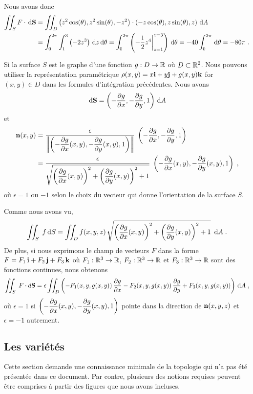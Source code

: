 {\begin{egg}
Nous avons donc
\begin{align*}
\iint_S F \cdot \,\mathrm{d}\mathbf{S} &=  
\iint_D \left( z^2 \cos(\theta) , z^2\sin(\theta), -z^2\right) \cdot
\left( -z\cos(\theta) , z \sin(\theta) , z\right) \,\mathrm{d}A \\
&= \int_0^{2\pi} \int_1^3 \left( -2z^3\right) \,\mathrm{d}z \,\mathrm{d}\theta
= \int_0^{2\pi} \left( -\frac{1}{2} z^4\bigg|_{z=1}^{z=3}\right) \,\mathrm{d}\theta
= -40 \int_0^{2\pi} \,\mathrm{d}\theta = -80 \pi \ .
\end{align*}
\end{egg}

Si la surface $S$ est le graphe d'une fonction $g:D\rightarrow \mathbb{R}$ où
$D \subset \mathbb{R}^2$.  Nous pouvons utiliser la représentation paramétrique 
$\rho(x,y)= x\mathbf{i} + y\mathbf{j} + g(x,y)\mathbf{k}$ for $(x,y) \in D$ dans les
formules d'intégration précédentes.  Nous avons
\[
\,\mathrm{d}\mathbf{S} = \left(-\frac{\partial g}{\partial x} , -\frac{\partial g}{\partial y}, 1\right) \,\mathrm{d}A
\]
et
\begin{align*}
\mathbf{n}(x,y) &=
\frac{\epsilon}
{\displaystyle \left\| \left(-\frac{\partial g}{\partial x}(x,y) , -\frac{\partial g}{\partial y}(x,y) , 1\right)
\right\|} \; \left(-\frac{\partial g}{\partial x} , -\frac{\partial g}{\partial y}, 1\right) \\
&= \frac{\epsilon}{\displaystyle \sqrt{ \left(\frac{\partial g}{\partial x}(x,y)\right)^2 +
    \left(\frac{\partial g}{\partial y}(x,y)\right)^2 + 1}}\;
\left(-\frac{\partial g}{\partial x}(x,y) , -\frac{\partial g}{\partial y}(x,y), 1\right) \; ,
\end{align*}
où $\epsilon = 1$ ou $-1$ selon le choix du vecteur qui donne
l'orientation de la surface $S$.

Comme nous avons vu,
\[
\iint_S\; f \,\mathrm{d}S =
\iint_D f(x,y,z)\,\sqrt{ \left(\frac{\partial g}{\partial x}(x,y)\right)^2 +
    \left(\frac{\partial g}{\partial y}(x,y)\right)^2 + 1}\ \,\mathrm{d}A \; .
\]
De plus, si nous exprimons le champ de vecteurs $F$ dans la forme
$F = F_1\,\mathbf{i} + F_2\,\mathbf{j} + F_3\,\mathbf{k}$ où $F_1:\mathbb{R}^3\rightarrow \mathbb{R}$,
$F_2:\mathbb{R}^3\rightarrow \mathbb{R}$ et $F_3:\mathbb{R}^3\rightarrow \mathbb{R}$ sont des fonctions
continues, nous obtenons
\[
\iint_S\; F\cdot d\mathbf{S} = \epsilon \iint_D
\left(-F_1(x,y,g(x,y)) \, \frac{\partial g}{\partial x} -F_2(x,y,g(x,y))\,\frac{\partial g}{\partial y}
  + F_3(x,y,g(x,y))\right)\,\mathrm{d}A \; ,
\]
où $\epsilon = 1$ si
$\displaystyle \left(-\frac{\partial g}{\partial x}(x,y),
-\frac{\partial g}{\partial y}(x,y), 1\right)$ pointe dans la direction de
$\mathbf{n}(x,y,z)$ et $\epsilon = -1$ autrement.

\subsection{Les variétés \theory} \label{variety}

Cette section demande une connaissance minimale de la topologie qui
n'a pas été présentée dans ce document.  Par contre, plusieurs des
notions requises peuvent être comprises à partir des figures que nous
avons incluses.

}
